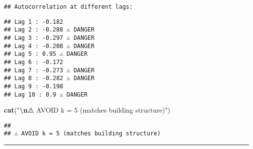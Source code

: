 \documentclass[
]{article}
\newenvironment{Shaded}{\begin{snugshade}}{\end{snugshade}}
\newcommand{\ControlFlowTok}[1]{\textcolor[rgb]{0.13,0.29,0.53}{\textbf{#1}}}
\newcommand{\DecValTok}[1]{\textcolor[rgb]{0.00,0.00,0.81}{#1}}
\newcommand{\FloatTok}[1]{\textcolor[rgb]{0.00,0.00,0.81}{#1}}
\newcommand{\FunctionTok}[1]{\textcolor[rgb]{0.13,0.29,0.53}{\textbf{#1}}}
\newcommand{\NormalTok}[1]{#1}
\newcommand{\SpecialCharTok}[1]{\textcolor[rgb]{0.81,0.36,0.00}{\textbf{#1}}}
\newcommand{\StringTok}[1]{\textcolor[rgb]{0.31,0.60,0.02}{#1}}
\begin{document}
\begin{verbatim}
## Autocorrelation at different lags:
\end{verbatim}

\begin{Shaded}
\end{Shaded}

\begin{verbatim}
## Lag 1 : -0.182 
## Lag 2 : -0.288 ⚠️ DANGER
## Lag 3 : -0.297 ⚠️ DANGER
## Lag 4 : -0.208 ⚠️ DANGER
## Lag 5 : 0.95 ⚠️ DANGER
## Lag 6 : -0.172 
## Lag 7 : -0.273 ⚠️ DANGER
## Lag 8 : -0.282 ⚠️ DANGER
## Lag 9 : -0.198 
## Lag 10 : 0.9 ⚠️ DANGER
\end{verbatim}

\begin{Shaded}
\begin{Highlighting}[]
\FunctionTok{cat}\NormalTok{(}\StringTok{"}\SpecialCharTok{\textbackslash{}n}\StringTok{⚠️ AVOID k = 5 (matches building structure)"}\NormalTok{)}
\end{Highlighting}
\end{Shaded}

\begin{verbatim}
## 
## ⚠️ AVOID k = 5 (matches building structure)
\end{verbatim}

\begin{center}\rule{0.5\linewidth}{0.5pt}\end{center}
\end{document}

